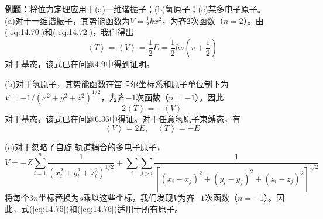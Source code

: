     \begin{examplebox}
        \textbf{例题：}将位力定理应用于(a)一维谐振子；(b)氢原子；(c)某多电子原子。
        \\

        (a)对于一维谐振子，其势能函数为$V = \frac{1}{2} kx^2$，为齐2次函数（$n=2$）。由(\ref{eq:14.70})和(\ref{eq:14.72})，我们得出
        \begin{equation}
            \left\langle T \right\rangle = \left\langle V \right\rangle = \frac{1}{2}E = \frac{1}{2} \hbar \nu \left(v + \frac{1}{2}\right)
            \label{eq:14.74}
        \end{equation}
        对于基态，该式已在问题4.9中得到证明。

        (b)对于氢原子，其势能函数在笛卡尔坐标系和原子单位制下为$V = -1 / \left(x^2 + y^2 + z^2\right)^{1/2}$，为齐$-1$次函数（$n=-1$）。因此
        \begin{equation}
            2 \left\langle T \right\rangle = -\left\langle V \right\rangle
            \label{eq:14.75}
        \end{equation}
        对于基态，该式已在问题6.36中得证。对于任意氢原子束缚态，有
        \begin{equation}
            \left\langle V \right\rangle = 2E, \quad \left\langle T \right\rangle = -E
            \label{eq:14.76}
        \end{equation}

        (c)对于忽略了自旋-轨道耦合的多电子原子，
        \begin{equation*}
            V = -Z \sum_{i=1}^{n} \frac{1}{\left(x_i^2 + y_i^2 + z_i^2\right)^{1/2}} + \sum_i \sum_{j>i} \frac{1}{\left[\left(x_i - x_j\right)^2 + \left(y_i - y_j\right)^2 + \left(z_i - z_j\right)^2\right]^{1/2}}
        \end{equation*}
        将每个$3n$坐标替换为$s$乘以这些坐标，我们发现$V$为齐$-1$次函数（$n=-1$）。因此，式(\ref{eq:14.75})和(\ref{eq:14.76})适用于所有原子。
    \end{examplebox}

